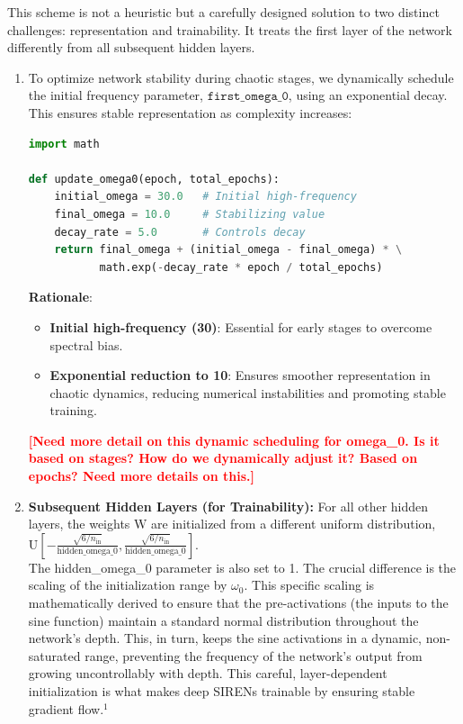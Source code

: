 \documentclass{article}
\newcommand{\authcomment}[1]{\textcolor{red}{\textbf{[#1]}}}
\begin{document}
This scheme is not a heuristic but a carefully designed solution to two distinct challenges: representation and trainability. It treats the first layer of the network differently from all subsequent hidden layers.

\begin{enumerate}
    \item 
    To optimize network stability during chaotic stages, we dynamically schedule the initial frequency parameter, $\texttt{first\_omega\_0}$, using an exponential decay. This ensures stable representation as complexity increases:

    \begin{lstlisting}[language=Python, caption={Implementation of Dynamic Frequency Scheduling}]
import math

def update_omega0(epoch, total_epochs):
    initial_omega = 30.0   # Initial high-frequency
    final_omega = 10.0     # Stabilizing value  
    decay_rate = 5.0       # Controls decay
    return final_omega + (initial_omega - final_omega) * \
           math.exp(-decay_rate * epoch / total_epochs)
    \end{lstlisting}




    \textbf{Rationale}:

    \begin{itemize}
        \item \textbf{Initial high-frequency (30)}: Essential for early stages to overcome spectral bias.
        \item \textbf{Exponential reduction to 10}: Ensures smoother representation in chaotic dynamics, reducing numerical instabilities and promoting stable training.
    \end{itemize}

    \authcomment{Need more detail on this dynamic scheduling for omega\_0. 
    Is it based on stages? How do we dynamically adjust it? Based on epochs? Need more details on this.}

    \item \textbf{Subsequent Hidden Layers (for Trainability):} For all other hidden layers, the weights $\mathrm{W}$ are initialized from a 
    different uniform distribution, $\mathrm{U}\left[-\frac{\sqrt{6/n_{\text{in}}}}{\text{hidden\_omega\_0}}, \frac{\sqrt{6/n_{\text{in}}}}{\text{hidden\_omega\_0}}\right]$. \\
    
    The hidden\_omega\_0 parameter is also set to 1. The crucial difference is the scaling of the initialization range by $\omega_0$. This specific scaling is mathematically derived to ensure that the pre-activations (the inputs to the sine function) maintain a standard normal distribution throughout the network's depth. This, in turn, keeps the sine activations in a dynamic, non-saturated range, preventing the frequency of the network's output from growing uncontrollably with depth. This careful, layer-dependent initialization is what makes deep SIRENs trainable by ensuring stable gradient flow.$^1$


\end{enumerate}
\end{document}
